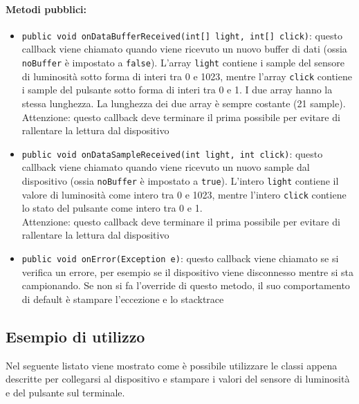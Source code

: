 \paragraph{Metodi pubblici:}\begin{itemize}
	\item \texttt{public void onDataBufferReceived(int[] light, int[] click){}}: questo callback viene chiamato quando viene ricevuto un nuovo buffer di dati (ossia \texttt{noBuffer} è impostato a \texttt{false}). L'array \texttt{light} contiene i sample del sensore di luminosità sotto forma di interi tra 0 e 1023, mentre l'array \texttt{click} contiene i sample del pulsante sotto forma di interi tra 0 e 1. I due array hanno la stessa lunghezza. La lunghezza dei due array è sempre costante (21 sample).\\
	Attenzione: questo callback deve terminare il prima possibile per evitare di rallentare la lettura dal dispositivo
	\item \texttt{public void onDataSampleReceived(int light, int click){}}: questo callback viene chiamato quando viene ricevuto un nuovo sample dal dispositivo (ossia \texttt{noBuffer} è impostato a \texttt{true}). L'intero \texttt{light} contiene il valore di luminosità come intero tra 0 e 1023, mentre l'intero \texttt{click} contiene lo stato del pulsante come intero tra 0 e 1.\\
	Attenzione: questo callback deve terminare il prima possibile per evitare di rallentare la lettura dal dispositivo
	\item \texttt{public void onError(Exception e)}: questo callback viene chiamato se si verifica un errore, per esempio se il dispositivo viene disconnesso mentre si sta campionando. Se non si fa l'override di questo metodo, il suo comportamento di default è stampare l'eccezione e lo stacktrace
\end{itemize}

\subsection{Esempio di utilizzo}
Nel seguente listato viene mostrato come è possibile utilizzare le classi appena descritte per collegarsi al dispositivo e stampare i valori del sensore di luminosità e del pulsante sul terminale.

